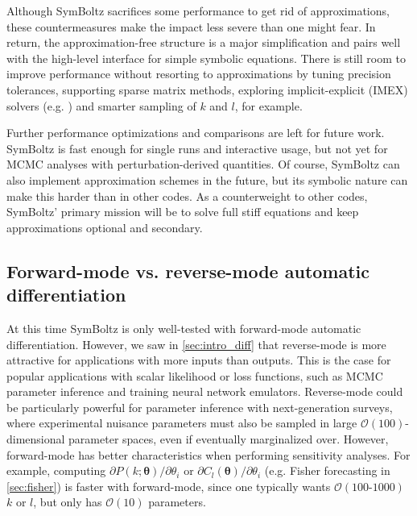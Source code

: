 \documentclass{aa}
\begin{document}
Although SymBoltz sacrifices some performance to get rid of approximations, these countermeasures make the impact less severe than one might fear.
In return, the approximation-free structure is a major simplification and pairs well with the high-level interface for simple symbolic equations.
There is still room to improve performance without resorting to approximations by tuning precision tolerances, supporting sparse matrix methods, exploring implicit-explicit (IMEX) solvers (e.g. \cite{kennedyAdditiveRungeKutta2003}) and smarter sampling of $k$ and $l$, for example.

Further performance optimizations and comparisons are left for future work.
SymBoltz is fast enough for single runs and interactive usage, but not yet for MCMC analyses with perturbation-derived quantities.
Of course, SymBoltz can also implement approximation schemes in the future, but its symbolic nature can make this harder than in other codes.
As a counterweight to other codes, SymBoltz' primary mission will be to solve full stiff equations and keep approximations optional and secondary.

\subsection{Forward-mode vs. reverse-mode automatic differentiation}
\label{sec:forwardreverse}


At this time SymBoltz is only well-tested with forward-mode automatic differentiation.
However, we saw in \cref{sec:intro_diff} that reverse-mode is more attractive for applications with more inputs than outputs.
This is the case for popular applications with scalar likelihood or loss functions, such as MCMC parameter inference and training neural network emulators.
Reverse-mode could be particularly powerful for parameter inference with next-generation surveys, where experimental nuisance parameters must also be sampled in large $\mathcal{O}(100)$-dimensional parameter spaces, even if eventually marginalized over.
However, forward-mode has better characteristics when performing sensitivity analyses.
For example, computing $\partial P(k; \boldsymbol{\theta})/\partial\theta_i $ or $\partial C_l(\boldsymbol{\theta}) / \partial \theta_i$
(e.g. Fisher forecasting in \cref{sec:fisher}) is faster with forward-mode, since one typically wants $\mathcal{O}(100\text{-}1000)$ $k$ or $l$, but only has $\mathcal{O}(10)$ parameters.
\end{document}
